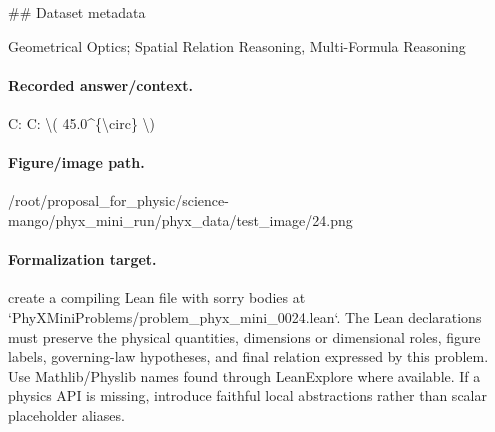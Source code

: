 \#\# Dataset metadata

Geometrical Optics; Spatial Relation Reasoning, Multi-Formula Reasoning

\paragraph{Recorded answer/context.}
C: C: \textbackslash{}( 45.0\textasciicircum{}\{\textbackslash{}circ\} \textbackslash{})

\paragraph{Figure/image path.}
/root/proposal\_for\_physic/science-mango/phyx\_mini\_run/phyx\_data/test\_image/24.png

\paragraph{Formalization target.}
create a compiling Lean file with sorry bodies at `PhyXMiniProblems/problem\_phyx\_mini\_0024.lean`. The Lean declarations must preserve the physical quantities, dimensions or dimensional roles, figure labels, governing-law hypotheses, and final relation expressed by this problem.
Use Mathlib/Physlib names found through LeanExplore where available. If a physics API is missing, introduce faithful local abstractions rather than scalar placeholder aliases.

